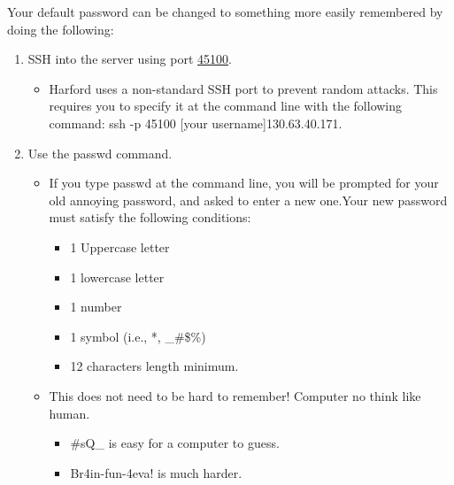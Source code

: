 \documentclass[final,titlepage,letterpaper,oneside,12pt]{article}
\renewcommand{\texttt}[2][BrickRed]{\textcolor{#1}{\ttfamily #2}}%
\begin{document}
Your default password can be changed to something more easily remembered by doing the following:

\begin{enumerate} \itemsep-2pt

    \item{SSH into the server using port \href{http://en.wikipedia.org/wiki/Looking_Glass_Studios}{45100}.}

    \begin{itemize} \itemsep-2pt
        
        \item{Harford uses a non-standard SSH port to prevent random attacks. This requires you to specify it at the command line with the following command: \texttt{ssh -p 45100 [your username]\@130.63.40.171}.}

    \end{itemize}
    
    \item{Use the \texttt{passwd} command.}
    
    \begin{itemize} \itemsep-2pt
        
        \item{If you type passwd at the command line, you will be prompted for your old annoying password, and asked to enter a new one.Your new password must satisfy the following conditions:}
        
        \begin{itemize} \itemsep-2pt
            \item{1 Uppercase letter}
            \item{1 lowercase letter}
            \item{1 number}
            \item{1 symbol (i.e., *, \_\#\$\%)}
            \item{12 characters length minimum.}
        \end{itemize}
        
        \item{This does not need to be hard to remember! Computer no think like human.}
        
        \begin{itemize} \itemsep-2pt
            
            \item{\texttt{\#sQ\_} is easy for a computer to guess.}

            \item{\texttt{Br4in-fun-4eva!} is much harder.}

        \end{itemize}
    \end{itemize}
\end{enumerate}
\end{document}
